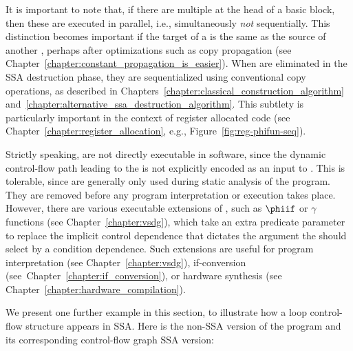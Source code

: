 It is important to note that, if there are multiple \phifuns{}
at the head of a basic block, then these are executed in parallel, 
i.e., simultaneously \textit{not} sequentially.
This distinction becomes important if the target of a \phifun
is the same as the source of another \phifun, perhaps after
optimizations such as copy propagation
(see Chapter~\ref{chapter:constant_propagation_is_easier}).
When \phifuns are eliminated in the SSA destruction phase,
they are sequentialized using conventional 
copy operations,
as described in Chapters~\ref{chapter:classical_construction_algorithm} and~\ref{chapter:alternative_ssa_destruction_algorithm}. This subtlety is particularly important in the context of register allocated code (see Chapter~\ref{chapter:register_allocation}, e.g., Figure~\ref{fig:reg-phifun-seq}).



Strictly speaking, \phifuns are not directly executable in software,
since the dynamic control-flow path leading to the \phifun
is not explicitly encoded as an input to \phifun.
This is tolerable, since \phifuns are generally only 
used during static analysis of the program. They are removed
before any program interpretation or execution takes place.
However, there are various executable extensions of \phifuns, 
such as $\phiif$ or $\gamma$ functions (see Chapter~\ref{chapter:vsdg}), which take
an extra predicate parameter to replace the implicit
control dependence that dictates the argument the \phifun should select by a condition dependence. Such extensions are useful for program interpretation (see Chapter~\ref{chapter:vsdg}), if-conversion (see~Chapter~\ref{chapter:if_conversion}), or hardware synthesis (see Chapter~\ref{chapter:hardware_compilation}).



We present one further example in this section,
to illustrate how a loop control-flow structure appears in SSA.
Here is the non-SSA version of the program and its corresponding control-flow graph SSA version:
\medskip

